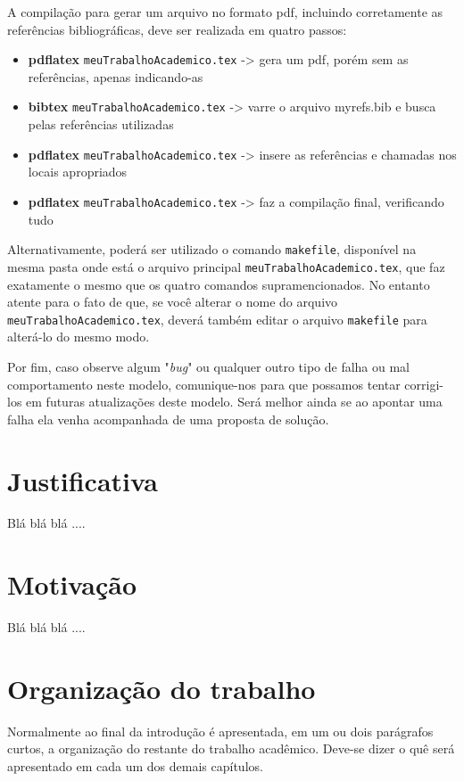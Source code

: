A compilação para gerar um arquivo no formato pdf, incluindo corretamente as referências bibliográficas, deve ser realizada em quatro passos:

\begin{itemize}
    \item \textbf{pdflatex} \verb|meuTrabalhoAcademico.tex|    -> gera um pdf, porém sem as referências, apenas indicando-as
    \item \textbf{bibtex} \verb|meuTrabalhoAcademico.tex|   -> varre o arquivo myrefs.bib e busca pelas referências utilizadas
    \item \textbf{pdflatex} \verb|meuTrabalhoAcademico.tex| -> insere as referências e chamadas nos locais apropriados
    \item \textbf{pdflatex} \verb|meuTrabalhoAcademico.tex| -> faz a compilação final, verificando tudo
\end{itemize}

Alternativamente, poderá ser utilizado o comando \verb|makefile|, disponível na mesma pasta onde está o arquivo principal \verb|meuTrabalhoAcademico.tex|, que faz exatamente o mesmo que os quatro comandos supramencionados.
No entanto atente para o fato de que, se você alterar o nome do arquivo \verb|meuTrabalhoAcademico.tex|, deverá também editar o arquivo \verb|makefile| para alterá-lo do mesmo modo.

Por fim, caso observe algum "\textit{bug}"{} ou qualquer outro tipo de falha ou mal comportamento neste modelo, comunique-nos para que possamos tentar corrigi-los em futuras atualizações deste modelo.
Será melhor ainda se ao apontar uma falha ela venha acompanhada de uma proposta de solução.

\section{Justificativa}
\label{sec:justificativa}

Blá blá blá ....

\section{Motivação}
\label{sec:motivacao}

Blá blá blá ....

\section{Organização do trabalho}
\label{sec:organizacaoTrabalho}

Normalmente ao final da introdução é apresentada, em um ou dois parágrafos curtos, a organização do restante do trabalho acadêmico.
Deve-se dizer o quê será apresentado em cada um dos demais capítulos.

